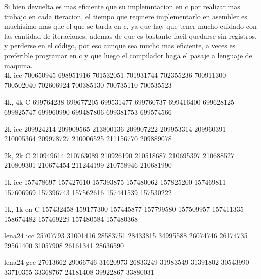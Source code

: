 Si bien devuelta es mas eficiente que su implemntacion en c por realizar mas trabajo en cada iteracion, el tiempo que requiere implementarlo en asembler es muchísimo mas que el que se tarda en c, ya que hay que tener mucho cuidado con las cantidad de iteraciones, ademas de que es bastante facil quedarse sin registros, y perderse en el código, por eso aunque sea mucho mas eficiente, a veces es preferible programar en c y que luego el compilador haga el pasaje a lenguaje de maquina. \\







4k icc
700650945
698951916
701532051
701931744
702355236
700911300
700502040
702606924
700385130
700735110
700535523

4k, 4k C
699764238
699677205
699531477
699760737
699416400
699628125
699825747
699960990
699487806
699381753
699574566


2k icc
209924214
209909565
213800136
209907222
209953314
209960391
210005364
209978727
210006525
211156770
209889078

2k, 2k C
210949614
210763089
210926190
210518687
210695397
210688527
210809301
210674454
211244199
210758946
210681990





1k icc
157478697
157427610
157393875
157480062
157825200
157469811
157606969
157396743
157562616
157441539
157530222

1k, 1k en C
157432458
159177300
157445877
157799580
157509957
157411335
158674482
157469229
157480584
157480368




lena24 icc
25707793
31001416
28583751
28433815
34995588
26074746
26174735
29561400
31057908
26161341
28636590

lena24 gcc
27013662
29066746
31620973
26833249
31983549
31391802
30543990
33710355
33368767
24181408
39922867
33880031












